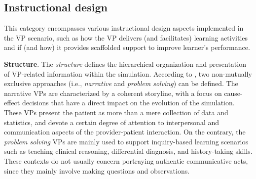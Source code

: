 \subsection{Instructional design}
\label{sec:instructionalDesign}

This category encompasses various instructional design aspects implemented in the VP scenario, such as how the VP delivers (and facilitates) learning activities and if (and how) it provides scaffolded support to improve learner's performance.






\textbf{Structure}. The \emph{structure} defines the hierarchical organization and presentation of VP-related information within the simulation.
According to \cite{bearman2001random}, two non-mutually exclusive approaches (i.e., \emph{narrative} and \emph{problem solving}) can be defined. 
The narrative VPs are characterized by a coherent storyline, with a focus on cause-effect decisions that have a direct impact on the evolution of the simulation. These VPs present the patient as more than a mere collection of data and statistics, and devote a certain degree of attention to interpersonal and communication aspects of the provider-patient interaction.  On the contrary, the \emph{problem solving} VPs are mainly used to support inquiry-based learning scenarios such as teaching clinical reasoning, differential diagnosis, and history-taking skills. These contexts do not usually concern  portraying authentic communicative acts, since they mainly involve making questions and observations. 

